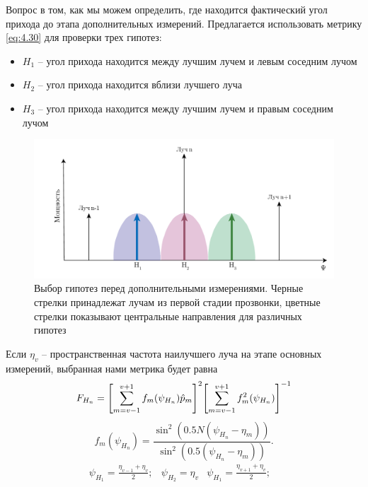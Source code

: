 Вопрос в том, как мы можем определить, где находится фактический угол прихода до этапа дополнительных измерений.
Предлагается использовать метрику \eqref{eq:4.30} для проверки трех гипотез:
\begin{itemize}
    \item $H_1$ -- угол прихода находится между лучшим лучем и левым соседним лучом
    \item $H_2$ -- угол прихода находится вблизи лучшего луча
    \item $H_3$ -- угол прихода находится между лучшим лучем и правым соседним лучом
\end{itemize}

\begin{figure}[h!]
    \centering
    \includegraphics[width=0.75\linewidth]{figs/fig4.13}
    \caption{Выбор гипотез перед дополнительными измерениями. Черные стрелки принадлежат лучам из первой стадии прозвонки, цветные стрелки показывают центральные направления для различных гипотез}
    \label{fig:4.13}
\end{figure}

Если $\eta_v$ --  пространственная частота наилучшего луча на этапе основных измерений, выбранная нами метрика будет равна
\begin{equation}
    \label{eq:4.34}
    F_{H_n} = \qty[\sum\limits_{m=v-1}^{v+1} f_m (\psi_{H_n}) \hat p_m]^2 \qty[\sum\limits_{m=v-1}^{v+1}f_m^2(\psi_{H_n})]^{-1}
\end{equation}
\begin{equation}
    \label{eq:4.35}
    f_m(\psi_{H_n}) = \frac{\sin^2 (0.5N(\psi_{H_n} - \eta_{m}))}{\sin^2(0.5(\psi_{H_n} - \eta_{m}))}.
\end{equation}
\begin{equation}
    \label{eq:4.36}
    \begin{matrix}
        \psi_{H_1} = \frac{\eta_{v-1} + \eta_v}{2}; &
        \psi_{H_2} = \eta_{v}                       &
        \psi_{H_1} = \frac{\eta_{v+1} + \eta_v}{2}; &
    \end{matrix}
\end{equation}


